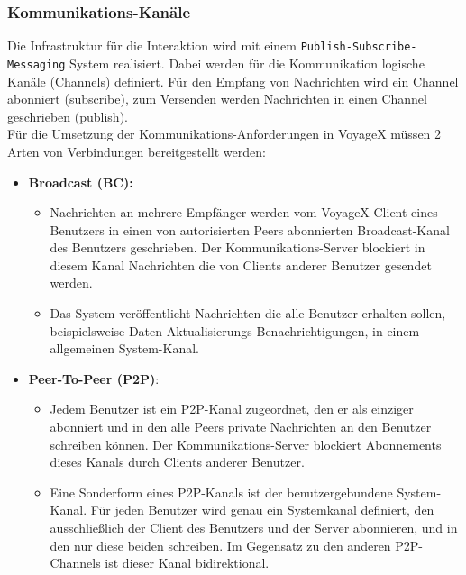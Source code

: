 \subsubsection{Kommunikations-Kanäle}
Die Infrastruktur für die Interaktion wird mit einem \texttt{Publish-Subscribe-Messaging} System realisiert. Dabei werden für die Kommunikation logische Kanäle (Channels) definiert. Für den Empfang von Nachrichten wird ein Channel abonniert (subscribe), zum Versenden werden Nachrichten in einen Channel geschrieben (publish).\\ Für die Umsetzung der Kommunikations-Anforderungen in VoyageX müssen 2 Arten von Verbindungen bereitgestellt werden:
\newpage
\begin{itemize}[leftmargin=*,noitemsep,topsep=1ex,parsep=0pt,partopsep=0pt]
\item \textbf{Broadcast (BC):}
	\begin{itemize}
		\item %
Nachrichten an mehrere Empfänger werden vom VoyageX-Client eines Benutzers in einen von autorisierten Peers abonnierten Broadcast-Kanal des Benutzers geschrieben. Der Kommunikations-Server blockiert in diesem Kanal Nachrichten die von Clients anderer Benutzer gesendet werden.
		\item Das System veröffentlicht Nachrichten die alle Benutzer erhalten sollen, beispielsweise Daten-Aktualisierungs-Benachrichtigungen, in einem allgemeinen System-Kanal.
	\end{itemize}

\item \textbf{Peer-To-Peer (P2P)}: 
	\begin{itemize}
		\item %
Jedem Benutzer ist ein P2P-Kanal zugeordnet, den er als einziger abonniert und in den alle Peers private Nachrichten an den Benutzer schreiben können. Der Kommunikations-Server blockiert Abonnements dieses Kanals durch Clients anderer Benutzer.
		\item Eine Sonderform eines P2P-Kanals ist der benutzergebundene System-Kanal. Für jeden Benutzer wird genau ein Systemkanal definiert, den ausschließlich der Client des Benutzers und der Server abonnieren, und in den nur diese beiden schreiben. Im Gegensatz zu den anderen P2P-Channels ist dieser Kanal bidirektional.
	\end{itemize}
\end{itemize}
